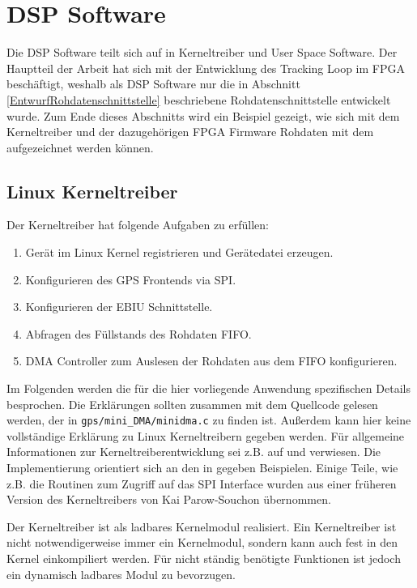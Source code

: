 \section{DSP Software}
Die DSP Software teilt sich auf in Kerneltreiber und User Space Software. Der Hauptteil der Arbeit hat sich mit der Entwicklung des Tracking Loop im FPGA beschäftigt, weshalb als DSP Software nur die in Abschnitt \ref{EntwurfRohdatenschnittstelle} beschriebene Rohdatenschnittstelle entwickelt wurde. Zum Ende dieses Abschnitts wird ein Beispiel gezeigt, wie sich mit dem Kerneltreiber und der dazugehörigen FPGA Firmware Rohdaten mit dem \comboard aufgezeichnet werden können.

\subsection{Linux Kerneltreiber}\label{Kerneltreiber}
Der Kerneltreiber hat folgende Aufgaben zu erfüllen:
\begin{enumerate}
    \item Gerät im Linux Kernel registrieren und Gerätedatei erzeugen. %
    \item Konfigurieren des GPS Frontends via SPI. %
    \item Konfigurieren der EBIU Schnittstelle. %
    \item Abfragen des Füllstands des Rohdaten FIFO. %
    \item DMA Controller zum Auslesen der Rohdaten aus dem FIFO konfigurieren. %
\end{enumerate}

Im Folgenden werden die für die hier vorliegende Anwendung spezifischen Details besprochen. Die Erklärungen sollten zusammen mit dem Quellcode gelesen werden, der in \lstinline$gps/mini_DMA/minidma.c$ zu finden ist. Außerdem kann hier keine vollständige Erklärung zu Linux Kerneltreibern  gegeben werden. Für allgemeine  Informationen zur Kerneltreiberentwicklung sei z.B. auf \cite{LinuxDeviceDrivers}  und \cite{quade2015linux} verwiesen. Die Implementierung orientiert sich an den in \cite{quade2015linux} gegeben Beispielen. Einige Teile, wie z.B. die Routinen zum Zugriff auf das SPI Interface wurden aus einer früheren Version des Kerneltreibers von Kai Parow-Souchon übernommen.

Der Kerneltreiber ist als ladbares Kernelmodul realisiert. Ein Kerneltreiber ist nicht notwendigerweise immer ein Kernelmodul, sondern kann auch fest in den Kernel einkompiliert werden. Für nicht ständig benötigte Funktionen ist jedoch ein dynamisch ladbares Modul zu bevorzugen.

